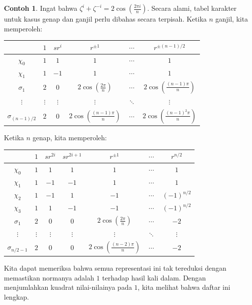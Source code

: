 \documentclass[12pt]{article}
\theoremstyle{plain}
\theoremstyle{definition}
\newtheorem{example}[theorem]{Contoh}
\theoremstyle{remark}
\numberwithin{equation}{section}
\begin{document}
\begin{example}
Ingat bahwa $\zeta^i+\zeta^{-i}=2\cos(\frac{2\pi i}{n})$.
Secara alami, tabel karakter untuk kasus genap dan ganjil perlu dibahas
secara terpisah.
Ketika $n$ ganjil, kita memperoleh:
\begin{center}
\begin{tabular}{|c|c|c|c|c|c|}
\hline 
 & $1$ & $sr^i$ & $r^{\pm 1}$ & $\cdots$ & $r^{\pm (n-1)/2}$\\
\hline 
\hline 
$\chi_0$ & $1$ & $1$ & $1$ & $\cdots$ & $1$\\
\hline 
$\chi_1$ & $1$ & $-1$ & $1$ & $\cdots$ & $1$\\
\hline 
$\sigma_{1}$ & $2$ & $0$ & $2\cos\left(\frac{2\pi}{n}\right)$ & $\cdots$
& $2\cos\left(\frac{ (n-1) \pi}{n}\right)$\\
\hline 
$\vdots$ & $\vdots$ & $\vdots$ & $\vdots$ & $\ddots$ & $\vdots$\\
\hline
$\sigma_{(n-1)/2}$ & $2$ & $0$ & $2\cos\left(\frac{(n-1)\pi}{n}\right)$
& $\cdots$ & $2\cos\left(\frac{ (n-1)^2 \pi}{n}\right)$\\
\hline
\end{tabular}
\end{center}
Ketika $n$ genap, kita memperoleh:
\begin{center}
\begin{tabular}{|c|c|c|c|c|c|c|}
\hline 
 & $1$ & $sr^{2i}$ & $sr^{2i+1}$ & $r^{\pm 1}$ & $\cdots$ & $r^{n/2}$\\
\hline 
\hline 
$\chi_0$ & $1$ & $1$ & $1$ & $1$ & $\cdots$ &  $1$\\
\hline 
$\chi_1$ & $1$ & $-1$ & $-1$ & $1$ & $\cdots$ & $1$\\
\hline 
$\chi_2$ & $1$ & $-1$ & $1$ & $-1$ & $\cdots$ &
$(-1)^{n/2}$\\
\hline 
$\chi_3$ & $1$ & $1$ & $-1$ & $-1$ & $\cdots$ & $(-1)^{n/2}$\\
\hline 
$\sigma_{1}$ & $2$ & $0$ & $0$ & $2\cos\left(\frac{2\pi}{n}\right)$ & $\cdots$
 & $-2$\\
\hline 
$\vdots$ & $\vdots$ & $\vdots$ & $\vdots$ & $\vdots$ & $\ddots$ & $\vdots$\\
\hline
$\sigma_{n/2-1}$ & $2$ & $0$ & $0$ &
$2\cos\left(\frac{(n-2)\pi}{n}\right)$ & $\cdots$ & $-2$\\
\hline
\end{tabular}
\end{center}
Kita dapat memeriksa bahwa semua representasi ini tak tereduksi dengan memastikan normanya
adalah $1$ terhadap hasil kali dalam. Dengan menjumlahkan kuadrat
nilai-nilainya pada $1$, kita melihat bahwa daftar ini lengkap.
\end{example}
\end{document}
